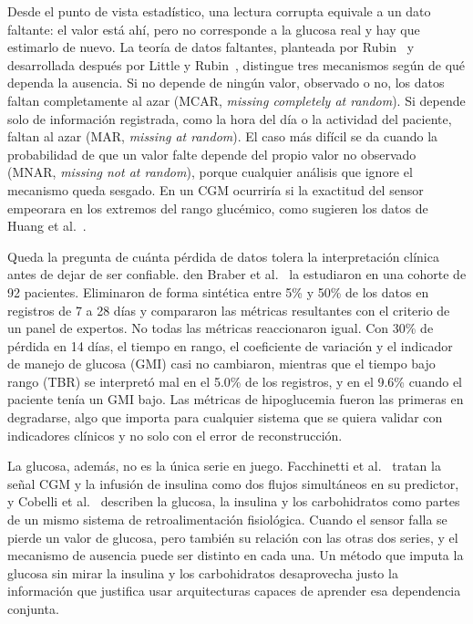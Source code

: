 \documentclass{report}
\begin{document}
Desde el punto de vista estadístico, una lectura corrupta equivale a un dato faltante: el valor está ahí, pero no corresponde a la glucosa real y hay que estimarlo de nuevo. La teoría de datos faltantes, planteada por Rubin~\cite{rubin1976} y desarrollada después por Little y Rubin~\cite{littlerubin2002}, distingue tres mecanismos según de qué dependa la ausencia. Si no depende de ningún valor, observado o no, los datos faltan completamente al azar (MCAR, \textit{missing completely at random}). Si depende solo de información registrada, como la hora del día o la actividad del paciente, faltan al azar (MAR, \textit{missing at random}). El caso más difícil se da cuando la probabilidad de que un valor falte depende del propio valor no observado (MNAR, \textit{missing not at random}), porque cualquier análisis que ignore el mecanismo queda sesgado. En un CGM ocurriría si la exactitud del sensor empeorara en los extremos del rango glucémico, como sugieren los datos de Huang et al.~\cite{huang2022accuracy}.

Queda la pregunta de cuánta pérdida de datos tolera la interpretación clínica antes de dejar de ser confiable. den Braber et al.~\cite{denbraber2024} la estudiaron en una cohorte de 92 pacientes. Eliminaron de forma sintética entre 5\% y 50\% de los datos en registros de 7 a 28 días y compararon las métricas resultantes con el criterio de un panel de expertos. No todas las métricas reaccionaron igual. Con 30\% de pérdida en 14 días, el tiempo en rango, el coeficiente de variación y el indicador de manejo de glucosa (GMI) casi no cambiaron, mientras que el tiempo bajo rango (TBR) se interpretó mal en el 5.0\% de los registros, y en el 9.6\% cuando el paciente tenía un GMI bajo. Las métricas de hipoglucemia fueron las primeras en degradarse, algo que importa para cualquier sistema que se quiera validar con indicadores clínicos y no solo con el error de reconstrucción.

La glucosa, además, no es la única serie en juego. Facchinetti et al.~\cite{facchinetti2013} tratan la señal CGM y la infusión de insulina como dos flujos simultáneos en su predictor, y Cobelli et al.~\cite{cobelli2009diabetes} describen la glucosa, la insulina y los carbohidratos como partes de un mismo sistema de retroalimentación fisiológica. Cuando el sensor falla se pierde un valor de glucosa, pero también su relación con las otras dos series, y el mecanismo de ausencia puede ser distinto en cada una. Un método que imputa la glucosa sin mirar la insulina y los carbohidratos desaprovecha justo la información que justifica usar arquitecturas capaces de aprender esa dependencia conjunta.
\end{document}
